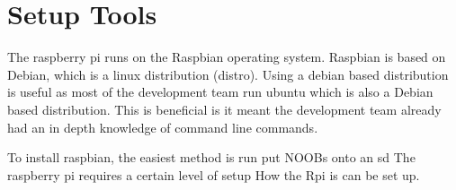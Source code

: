\section{Setup Tools}

The raspberry pi runs on the Raspbian operating system. Raspbian is based on Debian, which is a linux distribution (distro). Using a debian based distribution is useful as most of the development team run ubuntu which is also a Debian based distribution. This is beneficial is it meant the development team already had an in depth knowledge of command line commands.

To install raspbian, the easiest method is run put NOOBs onto an sd 
The raspberry pi requires a certain level of setup
How the Rpi is can be set up.